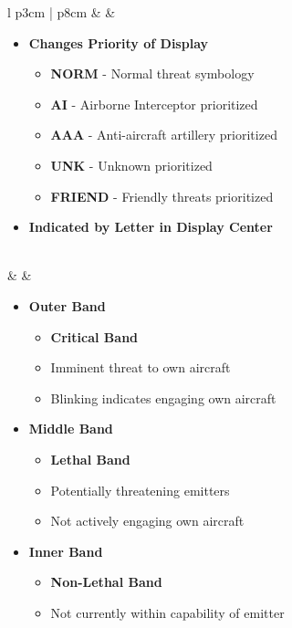 \documentclass[8pt,usenames,dvipsnames,twoside]{article}
\begin{document}
\begin{center}
\begin{longtable}{l p{3cm} | p{8cm}}
				\midrule
				\textbullet &   &
				\begin{minipage}[t]{\linewidth}
					\vspace{-7pt}
					\begin{itemize}
						\item \textbf{Changes Priority of Display}
						\begin{itemize}
							\item \textbf{NORM} - Normal threat symbology
							\item \textbf{AI} - Airborne Interceptor prioritized
							\item \textbf{AAA} - Anti-aircraft artillery prioritized
							\item \textbf{UNK} - Unknown prioritized
							\item \textbf{FRIEND} - Friendly threats prioritized
						\end{itemize}
						\item \textbf{Indicated by Letter in Display Center}
					\end{itemize}
				\end{minipage} \\
				\midrule
				\textbullet &  & 
				\begin{minipage}[t]{\linewidth}
					\vspace{-7pt}
					\begin{itemize}
						\item \textbf{Outer Band}
						\begin{itemize}
							\item \textbf{Critical Band}
							\item Imminent threat to own aircraft
							\item Blinking indicates engaging own aircraft
						\end{itemize}
						\item \textbf{Middle Band}
						\begin{itemize}
							\item \textbf{Lethal Band}
							\item Potentially threatening emitters
							\item Not actively engaging own aircraft
						\end{itemize}
						\item \textbf{Inner Band} 
						\begin{itemize}
							\item \textbf{Non-Lethal Band}
							\item Not currently within capability of emitter

\end{itemize}
\end{itemize}
\end{minipage}
\end{longtable}
\end{center}
\end{document}
